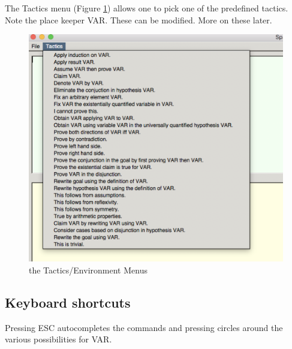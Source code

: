 The Tactics menu (Figure \ref{tactics}) allows one to pick one of the predefined tactics. 
Note the place keeper VAR. 
These can be modified. More on these later.

\begin{figure}[h!]
\includegraphics[scale=0.5]{Installation/menu2.png}


\caption{the Tactics/Environment Menus}\label{tactics}
\end{figure}
\subsection{Keyboard shortcuts}

Pressing ESC autocompletes the commands and pressing \VAR circles around the various possibilities for VAR.



